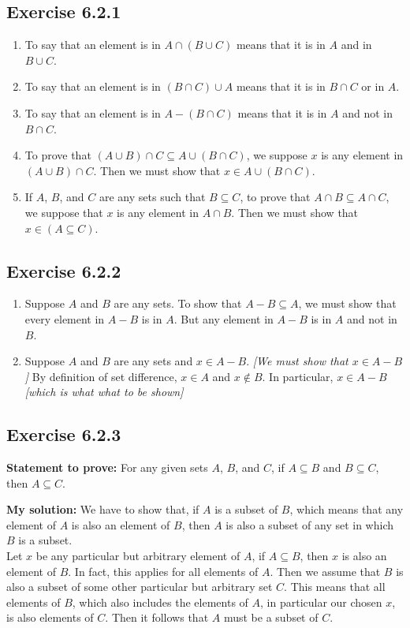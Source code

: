 \documentclass{article}
\newcommand{\In}{\! \in \!}
\newcommand{\Prove}{\textbf{Statement to prove: }}
\newcommand{\Solution}{\textbf{My solution: }}
\newcommand{\QED}{\boxed{}}
\newcommand{\Exercise}[1]{\subsection{Exercise #1}}
\begin{document}
	\Exercise{6.2.1}
	
	\begin{enumerate}[label=\textbf{\alph*.}]
		\item To say that an element is in $A \cap (B \cup C)$ means that it is in $A$ and in $B \cup C$.
		
		\item To say that an element is in $(B \cap C) \cup A$ means that it is in $B \cap C$ or in $A$.
		
		\item To say that an element is in $A - (B \cap C)$ means that it is in $A$ and not in $B\cap C$.
		
		\item To prove  that $(A \cup B) \cap C \subseteq A \cup (B \cap C )$, we suppose $x$ is any element in $(A \cup B) \cap C$. Then we must show that $x \In A \cup (B \cap C )$.
		
		\item If $A$, $B$, and $C$  are any sets such that $B \subseteq C$, to prove that $A \cap B \subseteq A \cap C$, we suppose that $x$ is any element in $A \cap B$. Then we must show  that $x \In (A \subseteq C)$.
	\end{enumerate}
	
	\Exercise{6.2.2}
	
	\begin{enumerate}[label=\textbf{\alph*.}]
		\item Suppose $A$ and $B$ are any sets. To show that $A-B \subseteq A$, we must show that every element in $A-B$ is in $A$. But any element in $A-B$ is in $A$ and not in $B$.
		
		\item Suppose $A$ and $B$ are any sets and $x\In A-B$. \textit{[We must show that $x \In A-B$]} By definition of set difference, $x \In A$ and $x \notin B$. In particular, $x \In A - B$ \textit{[which is what what to be shown]}
	\end{enumerate}

	\Exercise{6.2.3}
	
	\Prove
	For any given sets $A$, $B$, and $C$, if $A \subseteq B$ and $B \subseteq C$, then $A \subseteq C$. 
	
	\Solution
	We have to show that, if $A$ is a subset of  $B$, which means that any element of $A$ is also an element of $B$, then $A$ is also a subset of any set in which $B$ is a subset.\\
	
	Let $x$ be any particular but arbitrary element of $A$, if $A \subseteq B$, then $x$ is also an element of $B$.  In fact, this applies for all elements of $A$. Then we assume that $B$ is also a subset of some other particular but arbitrary set $C$. This means that all elements of $B$, which also includes the elements of $A$, in particular our chosen $x$, is also elements of $C$. Then it follows that $A$ must be a subset of $C$.\\
	\QED 
	
\end{document}
